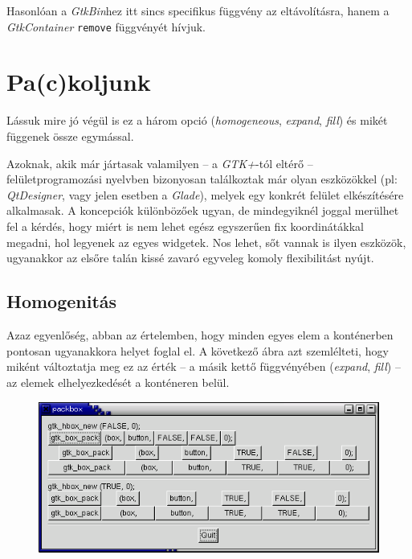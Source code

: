 \documentclass[a4paper,10pt]{article}
\begin{document}
Hasonlóan a \textit{GtkBin}hez itt sincs specifikus függvény az eltávolításra, hanem a \textit{GtkContainer} \texttt{remove} függvényét hívjuk.

\section{Pa(c)koljunk}

Lássuk mire jó végül is ez a három opció (\textit{homogeneous}, \textit{expand}, \textit{fill}) és mikét függenek össze egymással.

Azoknak, akik már jártasak valamilyen -- a \textit{GTK+}-tól eltérő -- felületprogramozási nyelvben bizonyosan találkoztak már olyan eszközökkel (pl: \textit{QtDesigner}, vagy jelen esetben a \textit{Glade}), melyek egy konkrét felület elkészítésére alkalmasak. A koncepciók különbözőek ugyan, de mindegyiknél joggal merülhet fel a kérdés, hogy miért is nem lehet egész egyszerűen fix koordinátákkal megadni, hol legyenek az egyes widgetek. Nos lehet, sőt vannak is ilyen eszközök, ugyanakkor az elsőre talán kissé zavaró egyveleg komoly flexibilitást nyújt.

\subsection{Homogenitás}

Azaz egyenlőség, abban az értelemben, hogy minden egyes elem a konténerben pontosan ugyanakkora helyet foglal el. A következő ábra azt szemlélteti, hogy miként változtatja meg ez az érték -- a másik kettő függvényében (\textit{expand}, \textit{fill}) -- az elemek elhelyezkedését a konténeren belül.

\vspace{12 pt}
\begin{figure}[H]
\begin{center}
\includegraphics[height=50mm]{packbox1.png}
\end{center}
\end{figure}
\end{document}
